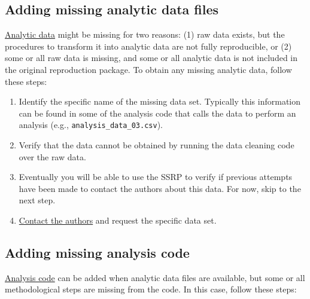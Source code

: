 \documentclass[
]{book}
\providecommand{\tightlist}{%
  \setlength{\itemsep}{0pt}\setlength{\parskip}{0pt}}
\begin{document}
\hypertarget{ad}{%
\subsection{Adding missing analytic data files}\label{ad}}

\protect\hyperlink{describe-inputs}{Analytic data} might be missing for two reasons: (1) raw data exists, but the procedures to transform it into analytic data are not fully reproducible, or (2) some or all raw data is missing, and some or all analytic data is not included in the original reproduction package. To obtain any missing analytic data, follow these steps:

\begin{enumerate}
\def\labelenumi{\arabic{enumi}.}
\tightlist
\item
  Identify the specific name of the missing data set. Typically this information can be found in some of the analysis code that calls the data to perform an analysis (e.g., \texttt{analysis\_data\_03.csv}).\\
\item
  Verify that the data cannot be obtained by running the data cleaning code over the raw data.\\
\item
  Eventually you will be able to use the SSRP to verify if previous attempts have been made to contact the authors about this data. For now, skip to the next step.\\
\item
  \protect\hyperlink{tips-for-communication}{Contact the authors} and request the specific data set.
\end{enumerate}

\hypertarget{ac}{%
\subsection{Adding missing analysis code}\label{ac}}

\protect\hyperlink{describe-inputs}{Analysis code} can be added when analytic data files are available, but some or all methodological steps are missing from the code. In this case, follow these steps:
\end{document}
